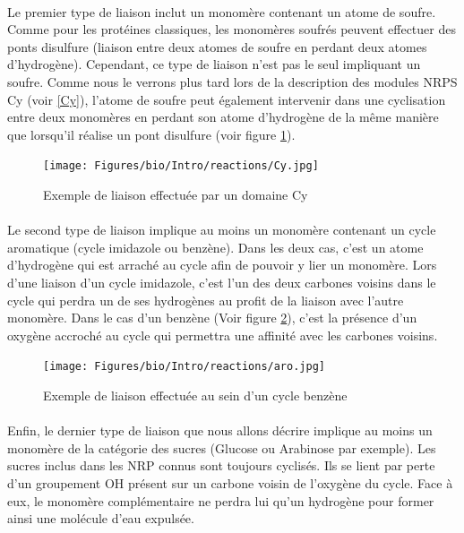 \documentclass[12pt,french,twoside]{report}
\begin{document}
\paragraph{}Le premier type de liaison inclut un monomère contenant un atome de soufre.
Comme pour les protéines classiques, les monomères soufrés peuvent effectuer des ponts disulfure (liaison entre deux atomes de soufre en perdant deux atomes d'hydrogène).
Cependant, ce type de liaison n'est pas le seul impliquant un soufre.
Comme nous le verrons plus tard lors de la description des modules NRPS Cy (voir \ref{Cy}), l'atome de soufre peut également intervenir dans une cyclisation entre deux monomères en perdant son atome d'hydrogène de la même manière que lorsqu'il réalise un pont disulfure (voir figure \ref{Cy_link}).

\begin{figure}[h!]
  \begin{center}
    \texttt{[image: Figures/bio/Intro/reactions/Cy.jpg]}
    \caption{\label{Cy_link}Exemple de liaison effectuée par un domaine Cy}
  \end{center}
\end{figure}

\paragraph{}Le second type de liaison implique au moins un monomère contenant un cycle aromatique (cycle imidazole ou benzène).
Dans les deux cas, c'est un atome d'hydrogène qui est arraché au cycle afin de pouvoir y lier un monomère.
Lors d'une liaison d'un cycle imidazole, c'est l'un des deux carbones voisins dans le cycle qui perdra un de ses hydrogènes au profit de la liaison avec l'autre monomère.
Dans le cas d'un benzène (Voir figure \ref{benzene}), c'est la présence d'un oxygène accroché au cycle qui permettra une affinité avec les carbones voisins.

\begin{figure}[h!]
  \begin{center}
    \texttt{[image: Figures/bio/Intro/reactions/aro.jpg]}
    \caption{\label{benzene}Exemple de liaison effectuée au sein d'un cycle benzène}
  \end{center}
\end{figure}

\paragraph{}Enfin, le dernier type de liaison que nous allons décrire implique au moins un monomère de la catégorie des sucres (Glucose ou Arabinose par exemple).
Les sucres inclus dans les NRP connus sont toujours cyclisés.
Ils se lient par perte d'un groupement OH présent sur un carbone voisin de l'oxygène du cycle.
Face à eux, le monomère complémentaire ne perdra lui qu'un hydrogène pour former ainsi une molécule d'eau expulsée.
\end{document}
